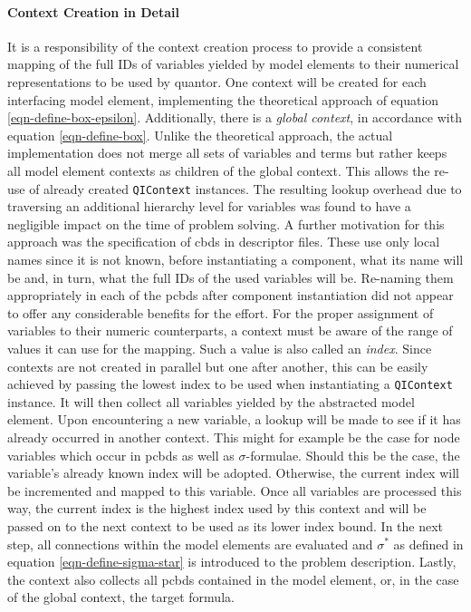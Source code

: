 	\paragraph{Context Creation in Detail}
	It is a responsibility of the context creation process to provide a consistent mapping of the full IDs of variables yielded by model elements to their numerical representations to be used by \gls{quantor}.
	One context will be created for each interfacing model element, implementing the theoretical approach of equation \ref{eqn-define-box-epsilon}.
	Additionally, there is a \emph{global context}, in accordance with equation \ref{eqn-define-box}.
	Unlike the theoretical approach, the actual implementation does not merge all sets of variables and terms but rather keeps all model element contexts as children of the global context.
	This allows the re-use of already created \texttt{QIContext} instances.
	The resulting lookup overhead due to traversing an additional hierarchy level for variables was found to have a negligible impact on the time of problem solving.
	A further motivation for this approach was the specification of \glspl{cbd} in descriptor files.
	These use only local names since it is not known, before instantiating a component, what its name will be and, in turn, what the full IDs of the used variables will be.
	Re-naming them appropriately in each of the \glspl{pcbd} after component instantiation did not appear to offer any considerable benefits for the effort.
	For the proper assignment of variables to their numeric counterparts, a context must be aware of the range of values it can use for the mapping.
	Such a value is also called an \emph{index}.
	Since contexts are not created in parallel but one after another, this can be easily achieved by passing the lowest index to be used when instantiating a \texttt{QIContext} instance.
	It will then collect all variables yielded by the abstracted model element.
	Upon encountering a new variable, a lookup will be made to see if it has already occurred in another context.
	This might for example be the case for node variables which occur in \glspl{pcbd} as well as $\sigma$-formulae.
	Should this be the case, the variable's already known index will be adopted.
	Otherwise, the current index will be incremented and mapped to this variable.
	Once all variables are processed this way, the current index is the highest index used by this context and will be passed on to the next context to be used as its lower index bound.
	In the next step, all connections within the model elements are evaluated and $\sigma^*$ as defined in equation \ref{eqn-define-sigma-star} is introduced to the problem description.
	Lastly, the context also collects all \glspl{pcbd} contained in the model element, or, in the case of the global context, the target formula.
	
